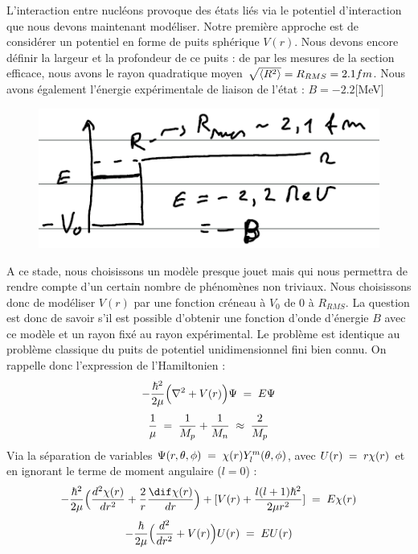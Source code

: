 L'interaction entre nucléons provoque des états liés via le potentiel d'interaction que nous devons maintenant modéliser. Notre première approche est de considérer un potentiel en forme de puits sphérique $V(r)$. Nous devons encore définir la largeur et la profondeur de ce puits : de par les mesures de la section efficace, nous avons le rayon quadratique moyen $\sqrt{\expval{R^2}} = R_{RMS} = 2.1fm$. Nous avons également l'énergie expérimentale de liaison de l'état : $B = -2.2$[MeV]
\begin{figure}[H]
    \centering
    \includegraphics[scale=0.8]{Images4/Puits.PNG}
\end{figure}
A ce stade, nous choisissons un modèle presque jouet mais qui nous permettra de rendre compte d'un certain nombre de phénomènes non triviaux. Nous choisissons donc de modéliser $V(r)$ par une fonction créneau à $V_0$ de 0 à $R_{RMS}$. La question est donc de savoir s'il est possible d'obtenir une fonction d'onde d'énergie $B$ avec ce modèle et un rayon fixé au rayon expérimental. Le problème est identique au problème classique du puits de potentiel unidimensionnel fini bien connu. On rappelle donc l'expression de l'Hamiltonien :
\begin{equation*}
    -\dfrac{\hbar^2}{2\mu}\Big(\nabla^2 + V(r)\Big)\Psi \; = \; E\Psi
\end{equation*}
\begin{equation*}
    \dfrac{1}{\mu} \; = \; \dfrac{1}{M_p} + \dfrac{1}{M_n} \; \approx \; \dfrac{2}{M_p}
\end{equation*}
Via la séparation de variables $\Psi(r,\theta,\phi) \; = \; \chi(r)Y_l^m(\theta,\phi)$, avec $U(r) \; = \; r\chi(r)$ et en ignorant le terme de moment angulaire ($l=0$) :
\begin{equation*}
    -\dfrac{\hbar^2}{2\mu}\Big(\dfrac{d^2\chi(r)}{dr^2} + \dfrac{2}{r}\dfrac{\dif\chi(r)}{dr}\Big) + [V(r) + \dfrac{l(l+1)\hbar^2}{2\mu r^2}]\eq E\chi(r)
\end{equation*}
\begin{equation*}
    -\dfrac{\hbar}{2\mu}\Big(\dfrac{d^2}{dr^2} + V(r) \Big)U(r) \; = \; EU(r)
\end{equation*}
